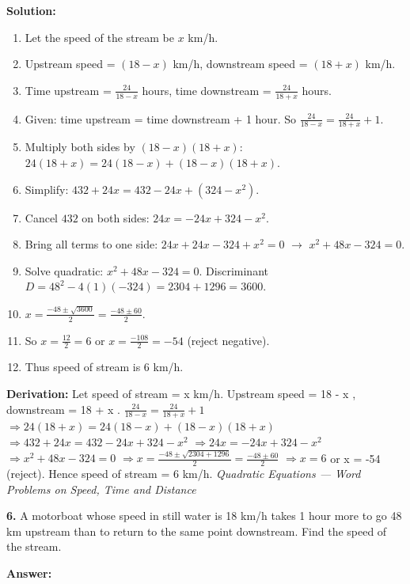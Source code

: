 \documentclass[12pt,a4paper]{exam}
\newcommand{\fitmath}[1]{%
  \sbox{\schmathbox}{$\displaystyle #1$}%
  \ifdim\wd\schmathbox>\linewidth
    \resizebox{\linewidth}{!}{\usebox{\schmathbox}}%
  \else
    \usebox{\schmathbox}%
  \fi}
\begin{document}
\begin{questions}
\textbf{Solution:}
\begin{enumerate}
  \item Let the speed of the stream be $x$ km/h.
  \item Upstream speed = $(18 - x)$ km/h, downstream speed = $(18 + x)$ km/h.
  \item Time upstream = $\frac{24}{18 - x}$ hours, time downstream = $\frac{24}{18 + x}$ hours.
  \item Given: time upstream = time downstream + 1 hour. So $\frac{24}{18 - x} = \frac{24}{18 + x} + 1$.
  \item Multiply both sides by $(18 - x)(18 + x)$: $24(18 + x) = 24(18 - x) + (18 - x)(18 + x)$.
  \item Simplify: $432 + 24x = 432 - 24x + (324 - x^2)$.
  \item Cancel $432$ on both sides: $24x = -24x + 324 - x^2$.
  \item Bring all terms to one side: $24x + 24x - 324 + x^2 = 0$ $\to$ $x^2 + 48x - 324 = 0$.
  \item Solve quadratic: $x^2 + 48x - 324 = 0$. Discriminant $D = 48^2 - 4(1)(-324) = 2304 + 1296 = 3600$.
  \item $x = \frac{-48 \pm \sqrt{3600}}{2} = \frac{-48 \pm 60}{2}$.
  \item So $x = \frac{12}{2} = 6$ or $x = \frac{-108}{2} = -54$ (reject negative).
  \item Thus speed of stream is $6$ km/h.
\end{enumerate}
\textbf{Derivation:}
Let speed of stream =  x  km/h.
Upstream speed =  18 - x , downstream =  18 + x .
 $\frac{24}{18 - x} = \frac{24}{18 + x} + 1$ 
 $\Rightarrow 24(18 + x) = 24(18 - x) + (18 - x)(18 + x)$ 
 $\Rightarrow 432 + 24x = 432 - 24x + 324 - x^2$ 
 $\Rightarrow 24x = -24x + 324 - x^2$ 
 $\Rightarrow x^2 + 48x - 324 = 0$ 
 $\Rightarrow x = \frac{-48 \pm \sqrt{2304 + 1296}}{2} = \frac{-48 \pm 60}{2}$ 
 $\Rightarrow x = 6$  or  x = -54  (reject).
Hence speed of stream =  6  km/h.
\hfill \textit{Quadratic Equations — Word Problems on Speed, Time and Distance}
\vspace{0.3cm}

\question \textbf{6.} A motorboat whose speed in still water is 18 km/h takes 1 hour more to go 48 km upstream than to return to the same point downstream. Find the speed of the stream.

\textbf{Answer:}
\begin{center}
\fitmath{\text{Speed of stream} = 6 km/h}
\end{center}


\end{questions}
\end{document}
